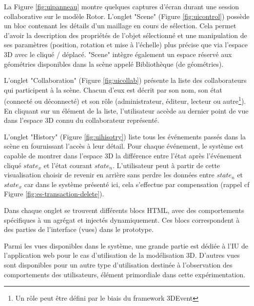 La Figure \ref{fig:uipanneau} montre quelques captures d'écran durant une 
session collaborative sur le modèle Rotor. L'onglet "Scene" (Figure 
\ref{fig:uicontrol}) possède un bloc contenant les détails 
d'un 
maillage en cours de 
sélection. Cela permet d'avoir la description des propriétés de l'objet sélectionné et 
une manipulation de ses paramètres (position, rotation et mise à l'échelle) plus 
précise que via l'espace \gls{3D} avec le cliqué / déplacé. "Scene" intègre 
également un espace réservé aux géométries disponibles dans la scène appelé 
Bibliothèque (de géométries).

L'onglet "Collaboration" (Figure \ref{fig:uicollab}) présente la liste des 
collaborateurs qui 
participent à la 
scène. Chacun d'eux est décrit par son nom, son état  (connecté ou déconnecté) 
et son rôle (administrateur, éditeur, lecteur ou autre\footnote{Un rôle peut être 
	défini par le biais du \gls{framework} 3DEvent}). En cliquant sur un élément de 
	la 
liste, l'utilisateur accède au dernier point de vue dans l'espace \gls{3D} connu du 
collaborateur représenté.

L'onglet "History" (Figure \ref{fig:uihisotry}) liste tous les événements passés dans 
la 
scène en fournissant 
l'accès à leur détail. Pour chaque événement, le système est capable de montrer 
dans l'espace \gls{3D} la différence entre l'état  après l'événement cliqué $state_x$ 
et l'état courant $state_n$. L'utilisateur peut à partir de cette visualisation choisir 
de \og revenir en arrière\fg{} sans perdre les données entre $state_n$ et $state_x$ 
car dans le système présenté ici, cela s'effectue par compensation (rappel cf 
Figure \ref{fig:es-transaction-delete}).

Dans chaque onglet se trouvent différents blocs \gls{HTML}, avec des 
comportements spécifiques à un agrégat et injectés dynamiquement. Ces blocs 
correspondent à des parties de l'interface (vues) dans le prototype.

Parmi les vues disponibles dans le système, une grande partie est dédiée à 
l'\gls{IU} de l'application web pour le cas d'utilisation de la modélisation 3D. 
D'autres vues sont disponibles pour un autre type d'utilisation destinée à 
l'observation des comportements des utilisateurs, élément primordiale dans 
cette expérimentation.



